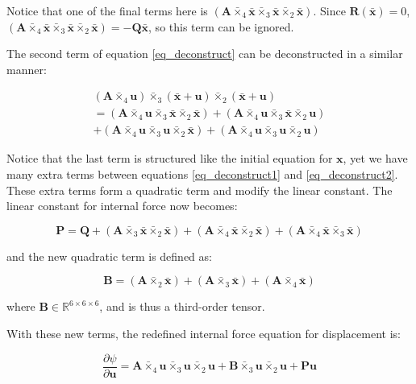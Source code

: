 \documentclass[twocolumn,10pt]{asme2ej}
\begin{document}
Notice that one of the final terms here is $(\bm{A} \bar{\times}_4 \bm{\bar{x}} \bar{\times}_3 \bm{\bar{x}} \bar{\times}_2 \bm{\bar{x}})$. Since $\bm{R}(\bm{\bar{x}}) = 0$, $(\bm{A} \bar{\times}_4 \bm{\bar{x}} \bar{\times}_3 \bm{\bar{x}} \bar{\times}_2 \bm{\bar{x}}) = -\bm{Q} \bm{\bar{x}}$, so this term can be ignored.

The second term of equation \ref{eq_deconstruct} can be deconstructed in a similar manner:

\begin{multline}
(\bm{A} \bar{\times}_4 \bm{u}) \bar{\times}_3 (\bm{\bar{x}} + \bm{u}) \bar{\times}_2 (\bm{\bar{x}}+ \bm{u})
\\ = (\bm{A} \bar{\times}_4 \bm{u} \bar{\times}_3 \bm{\bar{x}} \bar{\times}_2 \bm{\bar{x}})
+ (\bm{A} \bar{\times}_4 \bm{u} \bar{\times}_3 \bm{\bar{x}} \bar{\times}_2 \bm{u})
\\ + (\bm{A} \bar{\times}_4 \bm{u} \bar{\times}_3 \bm{u} \bar{\times}_2 \bm{\bar{x}})
+ (\bm{A} \bar{\times}_4 \bm{u} \bar{\times}_3 \bm{u} \bar{\times}_2 \bm{u})
\label{eq_deconstruct2}
\end{multline}

Notice that the last term is structured like the initial equation for $\bm{x}$, yet we have many extra terms between equations \ref{eq_deconstruct1} and \ref{eq_deconstruct2}. These extra terms form a quadratic term and modify the linear constant. The linear constant for internal force now becomes:

\begin{equation}
  \bm{P} = \bm{Q} + (\bm{A} \bar{\times}_3 \bm{\bar{x}} \bar{\times}_2 \bm{\bar{x}})
  + (\bm{A} \bar{\times}_4 \bm{\bar{x}} \bar{\times}_2 \bm{\bar{x}})
  + (\bm{A} \bar{\times}_4 \bm{\bar{x}} \bar{\times}_3 \bm{\bar{x}})
\end{equation}

and the new quadratic term is defined as:

\begin{equation}
  \bm{B} = (\bm{A} \bar{\times}_2 \bm{\bar{x}})
  + (\bm{A}\bar{\times}_3 \bm{\bar{x}})
  + (\bm{A} \bar{\times}_4 \bm{\bar{x}})
\end{equation}

where $\bm{B} \in \mathbb{R}^{6 \times 6 \times 6}$, and is thus a third-order tensor.

With these new terms, the redefined internal force equation for displacement is:

\begin{equation}
 \frac{\partial \psi}{\partial \bm{u}} = \bm{A} \bar{\times}_4 \bm{u} \bar{\times}_3 \bm{u} \bar{\times}_2 \bm{u}
 + \bm{B} \bar{\times}_3 \bm{u} \bar{\times}_2 \bm{u} + \bm{P}\bm{u}
\end{equation}
\end{document}
